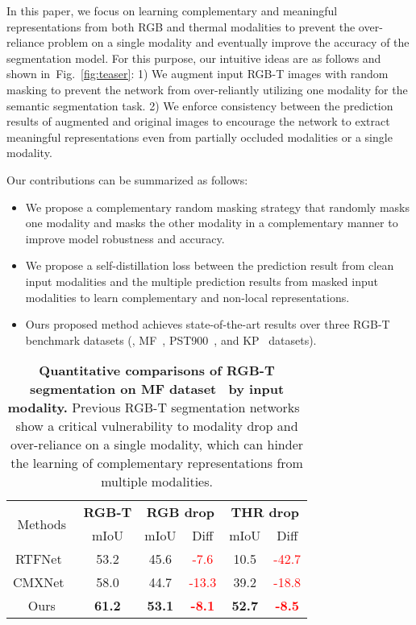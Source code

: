 \documentclass[10pt,twocolumn,letterpaper]{article}
\newcommand{\figref}[1]{Fig.~\ref{#1}}
\begin{document}
 
In this paper, we focus on learning complementary and meaningful representations from both RGB and thermal modalities to prevent the over-reliance problem on a single modality and eventually improve the accuracy of the segmentation model.
For this purpose, our intuitive ideas are as follows and shown in~\figref{fig:teaser}:
1) We augment input RGB-T images with random masking to prevent the network from over-reliantly utilizing one modality for the semantic segmentation task. 
2) We enforce consistency between the prediction results of augmented and original images to encourage the network to extract meaningful representations even from partially occluded modalities or a single modality.

Our contributions can be summarized as follows:
\begin{itemize}
\item 
We propose a complementary random masking strategy that randomly masks one modality and masks the other modality in a complementary manner to improve model robustness and accuracy.
\item 
We propose a self-distillation loss between the prediction result from clean input modalities and the multiple prediction results from masked input modalities to learn complementary and non-local representations.
\item
Ours proposed method achieves state-of-the-art results over three RGB-T benchmark datasets (\ie, MF~\cite{ha2017mfnet}, PST900~\cite{shivakumar2019pst900}, and KP~\cite{hwang2015multispectral,kim2021ms} datasets).
\end{itemize}

\begin{table}[t]
\caption{\textbf{Quantitative comparisons of RGB-T segmentation on MF dataset~\cite{ha2017mfnet} by input modality.}  
Previous RGB-T segmentation networks~\cite{sun2019rtfnet,liu2022cmx} show a critical vulnerability to modality drop and over-reliance  on a single modality, which can hinder the learning of complementary representations from multiple modalities.}
\vspace{-0.2in}
\begin{center}
\resizebox{0.98\linewidth}{!}
{
    \def\arraystretch{1.2}
    \footnotesize
    \begin{tabular}{c|c|c|c|c|c}
    \toprule
    \multirow{2}{*}{Methods} & \textbf{RGB-T} & \multicolumn{2}{c|}{\textbf{RGB drop}} & \multicolumn{2}{c}{\textbf{THR drop}} \\ \cline{2-6}
    & mIoU  & mIoU  & Diff  & mIoU  & Diff  \\
    \hline \hline
    RTFNet~\cite{sun2019rtfnet} & 53.2 & 45.6 & \textcolor{red}{-7.6} & 10.5 & \textcolor{red}{-42.7} \\
    CMXNet~\cite{liu2022cmx} & 58.0 & 44.7 & \textcolor{red}{-13.3} & 39.2 & \textcolor{red}{-18.8} \\
    Ours & \textbf{61.2} & \textbf{53.1} & \textcolor{red}{\textbf{-8.1}} & \textbf{52.7} & \textcolor{red}{\textbf{-8.5}} \\
    \bottomrule
    \end{tabular}
}
\end{center}
\vspace{-0.2in}
\label{tab:Motiv}
\end{table}
\end{document}
